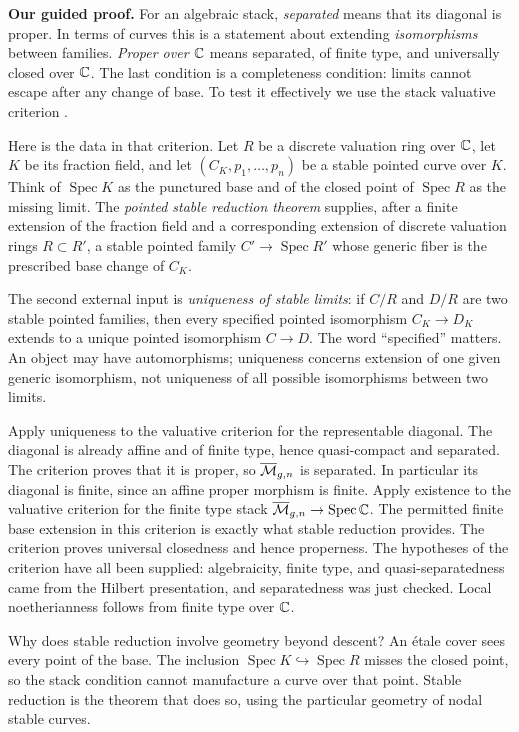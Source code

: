 \medskip
\noindent\textbf{Our guided proof.}
For an algebraic stack, \emph{separated} means that its diagonal
is proper. In terms of curves this is a statement about extending
\emph{isomorphisms} between families. \emph{Proper over $\mathbb C$}
means separated, of finite type, and universally closed over
$\mathbb C$. The last condition is a completeness condition: limits
cannot escape after any change of base. To test it effectively we
use the stack valuative criterion
\cite[Theorem 4.8.7, pp.~149--150]{Alper}.

Here is the data in that criterion. Let $R$ be a discrete valuation
ring over $\mathbb C$, let $K$ be its fraction field, and let
$(C_K,p_1,\ldots,p_n)$ be a stable pointed curve over $K$.
Think of $\operatorname{Spec}K$ as the punctured base and of
the closed point of $\operatorname{Spec}R$ as the missing limit.
The \emph{pointed stable reduction theorem} supplies, after a
finite extension of the fraction field and a corresponding
extension of discrete valuation rings $R\subset R'$, a stable
pointed family $C'\to\operatorname{Spec}R'$ whose generic fiber
is the prescribed base change of $C_K$.

The second external input is \emph{uniqueness of stable limits}:
if $C/R$ and $D/R$ are two stable pointed families, then every
specified pointed isomorphism $C_K\to D_K$ extends to a unique
pointed isomorphism $C\to D$. The word ``specified'' matters.
An object may have automorphisms; uniqueness concerns extension
of one given generic isomorphism, not uniqueness of all possible
isomorphisms between two limits.

Apply uniqueness to the valuative criterion for the representable
diagonal. The diagonal is already affine and of finite type, hence
quasi-compact and separated. The criterion proves that it is
proper, so $\overline{\mathcal M}_{g,n}$ is separated. In particular its diagonal is
finite, since an affine proper morphism is finite.
Apply existence to the valuative criterion for the finite type
stack $\overline{\mathcal M}_{g,n}\to\operatorname{Spec}\mathbb C$. The permitted finite
base extension in this criterion is exactly what stable reduction
provides. The criterion proves universal closedness and hence
properness. The hypotheses of the criterion have all been supplied:
algebraicity, finite type, and quasi-separatedness came from the
Hilbert presentation, and separatedness was just checked.
Local noetherianness follows from finite type over $\mathbb C$.

Why does stable reduction involve geometry beyond descent?
An \'etale cover sees every point of the base. The inclusion
$\operatorname{Spec}K\hookrightarrow\operatorname{Spec}R$
misses the closed point, so the stack condition cannot manufacture
a curve over that point. Stable reduction is the theorem that
does so, using the particular geometry of nodal stable curves.

